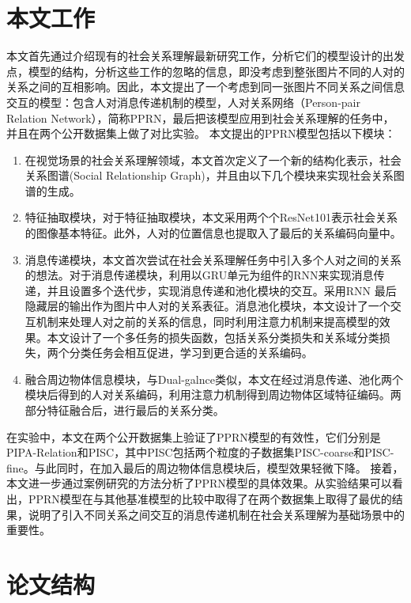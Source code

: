 \section{本文工作}

本文首先通过介绍现有的社会关系理解最新研究工作，分析它们的模型设计的出发点，模型的结构，分析这些工作的忽略的信息，即没考虑到整张图片不同的人对的关系之间的互相影响。因此，本文提出了一个考虑到同一张图片不同关系之间信息交互的模型：包含人对消息传递机制的模型，人对关系网络（Person-pair Relation Network），简称PPRN，最后把该模型应用到社会关系理解的任务中，并且在两个公开数据集上做了对比实验。
本文提出的PPRN模型包括以下模块：
\begin{enumerate}
    \item 在视觉场景的社会关系理解领域，本文首次定义了一个新的结构化表示，社会关系图谱(Social Relationship Graph)，并且由以下几个模块来实现社会关系图谱的生成。
    \item 特征抽取模块，对于特征抽取模块，本文采用两个个ResNet101\cite{he2016deep}表示社会关系的图像基本特征。此外，人对的位置信息也提取入了最后的关系编码向量中。
    \item 消息传递模块，本文首次尝试在社会关系理解任务中引入多个人对之间的关系的想法。对于消息传递模块，利用以GRU单元为组件的RNN来实现消息传递，并且设置多个迭代步，实现消息传递和池化模块的交互。采用RNN 最后隐藏层的输出作为图片中人对的关系表征。消息池化模块，本文设计了一个交互机制来处理人对之前的关系的信息，同时利用注意力机制来提高模型的效果。本文设计了一个多任务的损失函数，包括关系分类损失和关系域分类损失，两个分类任务会相互促进，学习到更合适的关系编码。
    \item 融合周边物体信息模块，与Dual-galnce\cite{li2017dual-glance}类似，本文在经过消息传递、池化两个模块后得到的人对关系编码，利用注意力机制得到周边物体区域特征编码。两部分特征融合后，进行最后的关系分类。
\end{enumerate}

在实验中，本文在两个公开数据集上验证了PPRN模型的有效性，它们分别是PIPA-Relation和PISC，其中PISC包括两个粒度的子数据集PISC-coarse和PISC-fine。与此同时，在加入最后的周边物体信息模块后，模型效果轻微下降。
接着，本文进一步通过案例研究的方法分析了PPRN模型的具体效果。从实验结果可以看出，PPRN模型在与其他基准模型的比较中取得了在两个数据集上取得了最优的结果，说明了引入不同关系之间交互的消息传递机制在社会关系理解为基础场景中的重要性。

\section{论文结构}

